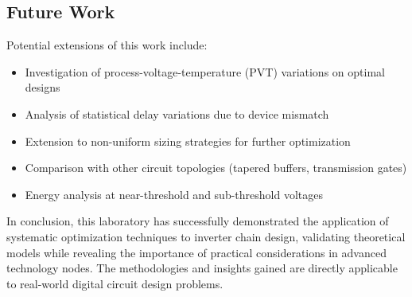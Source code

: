 \documentclass[UTF8,12pt,a4paper]{ctexart}
\begin{document}
\subsection{Future Work}

Potential extensions of this work include:
\begin{itemize}
    \item Investigation of process-voltage-temperature (PVT) variations on optimal designs
    \item Analysis of statistical delay variations due to device mismatch
    \item Extension to non-uniform sizing strategies for further optimization
    \item Comparison with other circuit topologies (tapered buffers, transmission gates)
    \item Energy analysis at near-threshold and sub-threshold voltages
\end{itemize}

In conclusion, this laboratory has successfully demonstrated the application of systematic optimization techniques to inverter chain design, validating theoretical models while revealing the importance of practical considerations in advanced technology nodes. The methodologies and insights gained are directly applicable to real-world digital circuit design problems.
\end{document}
